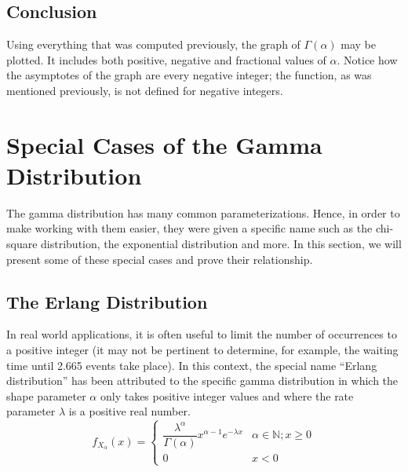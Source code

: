 \documentclass[12pt]{article}
\begin{document}

\pagebreak
\subsection{Conclusion}
Using everything that was computed previously, the graph of $\Gamma(\alpha)$ may be plotted. It includes both positive,
negative and fractional values of $\alpha$. Notice how the asymptotes of the graph are every negative integer; the
function, as was mentioned previously, is not defined for negative integers.


\pagebreak
\section{Special Cases of the Gamma Distribution}
The gamma distribution has many common parameterizations. Hence, in order to make working with them easier, they were
given a specific name such as the chi-square distribution, the exponential distribution and more. In this section, we
will present some of these special cases and prove their relationship.

\subsection{The Erlang Distribution}\label{subsec:specialcases:erlang}
In real world applications, it is often useful to limit the number of occurrences to a positive integer (it may not be
pertinent to determine, for example, the waiting time until 2.665 events take place). In this context, the special name
“Erlang distribution” has been attributed to the specific gamma distribution in which the shape parameter $\alpha$ only
takes positive integer values and where the rate parameter $\lambda$ is a positive real number.
\begin{equation}
	f_{X_\alpha}(x)	= 	\begin{cases}
							\dfrac{\lambda^\alpha}{\Gamma(\alpha)}x^{\alpha-1}e^{-\lambda x}  & \alpha\in\mathbb{N}; x\geq0\\
							0  & x<0
  						\end{cases}
\end{equation}
\end{document}
